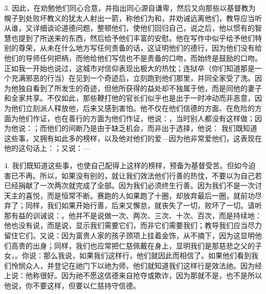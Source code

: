 3. 因此，在劝勉他们同心合意，并指出同心源自谦卑，然后又向那些以基督教为幌子到处败坏教义的犹太人射出一箭，称他们为和，并劝诫远离他们，教导应当听从谁，又详细谈论道德问题，整顿他们，使他们回归自己，说之后，他以惯有的智慧也提到了所送来的东西，然后给予他们丰富的安慰。他在写作中似乎给予他们特别的尊荣，从未在什么地方写任何责备的话，这证明他们的德行，因为他们没有给他们的导师任何把柄，而他给他们写信也不是责备的口吻，而始终是鼓励的口吻。正如我一开始也说过，这城市对信仰表现出极大的热忱；连狱卒（你们知道那是一个充满邪恶的行当）在见到一个奇迹后，立刻跑到他们那里，并同全家受了洗。因为他独自看到了所发生的奇迹，但他所获得的益处却不独属于他，而是同他的妻子和全家共享。不仅如此，那些鞭打他的官长们似乎也是出于一时冲动而非恶意，因为他们立刻派人释放他，后来又感到害怕。他不仅在他们信德的方面、在危险的方面为他们作证，也在善行的方面为他们作证，他说：，当时别人都没有这样做；因为他说：；而他们的间断乃是由于缺乏机会，而非出于选择，他说： 我们既知道这些事，又拥有如此多的榜样，以及他对他们的爱---因为他非常爱他们，这表现在他的这句话上：；又说：---\par

4. 我们既知道这些事，也使自己配得上这样的榜样，预备为基督受苦。但如今迫害已不再。所以，如果没有别的，就让我们效法他们行善的热忱，不要以为自己若已经捐献了一次两次就完成了全部。因为我们必须终生行善。因为我们不是一次讨天主的喜悦，而是恒常不断。赛跑的人如果跑了十圈，却放弃最后一圈，就前功尽弃了；同样，我们如果开始行善，后来又懈怠，就丧失了一切，败坏了一切。请听那有益的训诫说：。他并不是说做一次、两次、三次、十次、百次，而是持续地：他也没有说，而是说，显示我们需要它们，而非它们需要我们；教导我们应当尽力留住它们。又说：因为富贵人家的孩子颈项上挂着金饰，从不摘下，因为这显明他们高贵的出身；同样，我们也应常把仁慈佩戴在身上，显明我们是那慈悲之父的子女，。你说：那么我说，如果我们这样行，他们就因此而相信了。如果他们看到我们怜悯众人，并登记在祂门下以祂为师，他们就知道我们这样行是效法祂。因为经上说：他称很好。因为祂不愿这信德来自抢夺或欺诈，因为那就不是，也不是所以他说，你不要这样，但要以仁慈持守信德。\par

